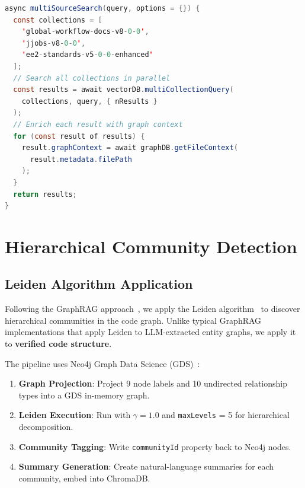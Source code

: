 \documentclass[11pt,letterpaper]{article}
\begin{document}
\begin{lstlisting}[language=Java, caption={Multi-collection search with graph enrichment}]
async multiSourceSearch(query, options = {}) {
  const collections = [
    'global-workflow-docs-v8-0-0',
    'jjobs-v8-0-0',
    'ee2-standards-v5-0-0-enhanced'
  ];
  // Search all collections in parallel
  const results = await vectorDB.multiCollectionQuery(
    collections, query, { nResults }
  );
  // Enrich each result with graph context
  for (const result of results) {
    result.graphContext = await graphDB.getFileContext(
      result.metadata.filePath
    );
  }
  return results;
}
\end{lstlisting}

\section{Hierarchical Community Detection}
\label{sec:communities}

\subsection{Leiden Algorithm Application}

Following the GraphRAG approach~\cite{edge2024graphrag}, we apply the
Leiden algorithm~\cite{traag2019leiden} to discover hierarchical
communities in the code graph. Unlike typical GraphRAG implementations
that apply Leiden to LLM-extracted entity graphs, we apply it to
\textbf{verified code structure}.

The pipeline uses Neo4j Graph Data Science (GDS)~\cite{neo4j_gds2024}:

\begin{enumerate}[nosep]
    \item \textbf{Graph Projection}: Project 9 node labels and 10
          undirected relationship types into a GDS in-memory graph.
    \item \textbf{Leiden Execution}: Run with $\gamma = 1.0$ and
          \texttt{maxLevels} = 5 for hierarchical decomposition.
    \item \textbf{Community Tagging}: Write \texttt{communityId} property
          back to Neo4j nodes.
    \item \textbf{Summary Generation}: Create natural-language summaries
          for each community, embed into ChromaDB.
\end{enumerate}
\end{document}
